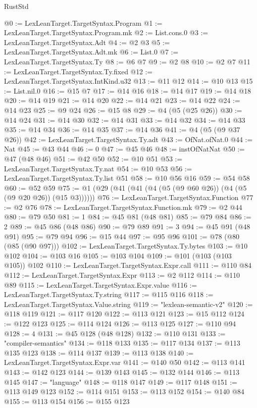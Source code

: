\begin{lexlean}{RustStd}
\begin{coremodule}
@0 := LexLeanTarget.TargetSyntax.Program
@1 := LexLeanTarget.TargetSyntax.Program.mk
@2 := List.cons.{0}
@3 := LexLeanTarget.TargetSyntax.Adt
@4 := @2 @3
@5 := LexLeanTarget.TargetSyntax.Adt.mk
@6 := List.{0}
@7 := LexLeanTarget.TargetSyntax.Ty
@8 := @6 @7
@9 := @2 @8
@10 := @2 @7
@11 := LexLeanTarget.TargetSyntax.Ty.fixed
@12 := LexLeanTarget.TargetSyntax.IntKind.u32
@13 := @11 @12
@14 := @10 @13
@15 := List.nil.{0}
@16 := @15 @7
@17 := @14 @16
@18 := @14 @17
@19 := @14 @18
@20 := @14 @19
@21 := @14 @20
@22 := @14 @21
@23 := @14 @22
@24 := @14 @23
@25 := @9 @24
@26 := @15 @8
@29 := @4 (@5 (@25 @26))
@30 := @14 @24
@31 := @14 @30
@32 := @14 @31
@33 := @14 @32
@34 := @14 @33
@35 := @14 @34
@36 := @14 @35
@37 := @14 @36
@41 := @4 (@5 (@9 @37 @26))
@42 := LexLeanTarget.TargetSyntax.Ty.adt
@43 := OfNat.ofNat.{0}
@44 := Nat
@45 := @43 @44
@46 := 0
@47 := @45 @46
@48 := instOfNatNat
@50 := @47 (@48 @46)
@51 := @42 @50
@52 := @10 @51
@53 := LexLeanTarget.TargetSyntax.Ty.nat
@54 := @10 @53
@56 := LexLeanTarget.TargetSyntax.Ty.list @51
@58 := @10 @56 @16
@59 := @54 @58
@60 := @52 @59
@75 := @1 (@29 (@41 (@41 (@4 (@5 (@9 @60 @26)) (@4 (@5 (@9 @20 @26)) (@15 @3))))))
@76 := LexLeanTarget.TargetSyntax.Function
@77 := @2 @76
@78 := LexLeanTarget.TargetSyntax.Function.mk
@79 := @2 @44
@80 := @79 @50
@81 := 1
@84 := @45 @81 (@48 @81)
@85 := @79 @84
@86 := 2
@89 := @45 @86 (@48 @86)
@90 := @79 @89
@91 := 3
@94 := @45 @91 (@48 @91)
@95 := @79 @94
@96 := @15 @44
@97 := @95 @96
@101 := @78 (@80 (@85 (@90 @97)))
@102 := LexLeanTarget.TargetSyntax.Ty.bytes
@103 := @10 @102
@104 := @103 @16
@105 := @103 @104
@109 := @101 (@103 (@103 @105)) @102
@110 := LexLeanTarget.TargetSyntax.Expr.call
@111 := @110 @84
@112 := LexLeanTarget.TargetSyntax.Expr
@113 := @2 @112
@114 := @110 @89
@115 := LexLeanTarget.TargetSyntax.Expr.value
@116 := LexLeanTarget.TargetSyntax.Ty.string
@117 := @115 @116
@118 := LexLeanTarget.TargetSyntax.Value.string
@119 := "lexlean-semantic-v2"
@120 := @118 @119
@121 := @117 @120
@122 := @113 @121
@123 := @15 @112
@124 := @122 @123
@125 := @114 @124
@126 := @113 @125
@127 := @110 @94
@128 := 4
@131 := @45 @128 (@48 @128)
@132 := @110 @131
@133 := "compiler-semantics"
@134 := @118 @133
@135 := @117 @134
@137 := @113 @135 @123
@138 := @114 @137
@139 := @113 @138
@140 := LexLeanTarget.TargetSyntax.Expr.var
@141 := @140 @50
@142 := @113 @141
@143 := @142 @123
@144 := @139 @143
@145 := @132 @144
@146 := @113 @145
@147 := "language"
@148 := @118 @147
@149 := @117 @148
@151 := @113 @149 @123
@152 := @114 @151
@153 := @113 @152
@154 := @140 @84
@155 := @113 @154
@156 := @155 @123

\end{coremodule}
\end{lexlean}
